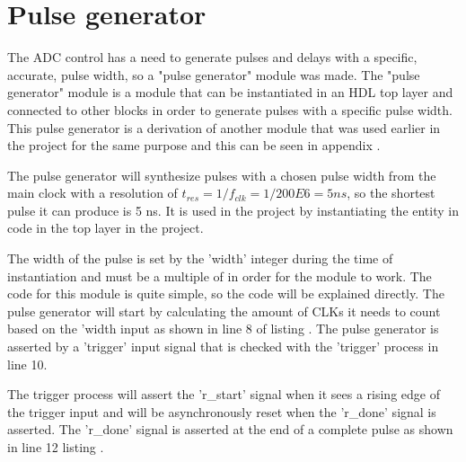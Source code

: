 \section{Pulse generator} \label{subsec:Pulse_Generator} 

The ADC control has a need to generate pulses and delays with a specific, accurate, pulse width, so a "pulse generator" module was made. The "pulse generator" module is a module that can be instantiated in an HDL top layer and connected to other blocks in order to generate pulses with a specific pulse width. This pulse generator is a derivation of another module that was used earlier in the project for the same purpose and this can be seen in appendix .

The pulse generator will synthesize pulses with a chosen pulse width from the main  clock with a resolution of $t_{res} = 1/f_{clk} = 1/200E6 = 5ns$, so the shortest pulse it can produce is 5 ns. It is used in the project by instantiating the entity in code  in the top layer in the project.



The width of the pulse is set by the 'width' integer during the time of instantiation and must be a multiple of  in order for the module to work. The code for this module is quite simple, so the code will be explained directly. The pulse generator will start by calculating the amount of CLKs it needs to count based on the 'width input as shown in line 8 of listing .  The pulse generator is asserted by a 'trigger' input signal that is checked with the 'trigger' process in line 10.



The trigger process will assert the 'r\_start' signal when it sees a rising edge of the trigger input and will be asynchronously reset when the 'r\_done' signal is asserted. The 'r\_done' signal is asserted at the end of a complete pulse as shown in line 12 listing .

